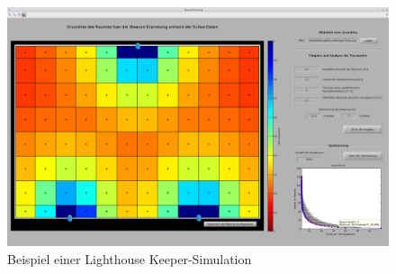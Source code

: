 \begin{landscape}
\begin{figure}[H] 
\includegraphics[scale=0.35]{Bilder/Simulationsbeispiel.png}
\caption{Beispiel einer Lighthouse Keeper-Simulation}
\label{fig:Simulationsbeispiel}
\end{figure}
\end{landscape}